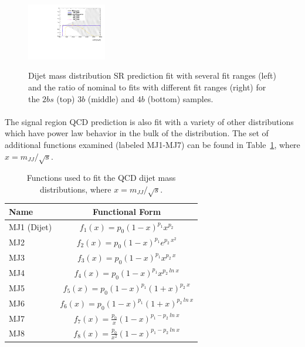 \begin{figure}[htbp!]
\begin{center}
\includegraphics[width=0.31\textwidth,angle=-90]{figures/boosted/Syst_Smooth/smoothFuncRangeCompare_44_comp_ratio.pdf} \\
\caption{Dijet mass distribution SR prediction fit with several fit ranges (left) and the ratio of nominal to fits with different fit ranges (right)  for the $2bs$ (top) $3b$ (middle) and $4b$ (bottom) samples. }
\label{fig:qcd_fit_range_sys_ratio-scaled}
\end{center}
\end{figure}

\paragraph{}
The signal region QCD prediction is also fit with a variety of other distributions which have power law behavior in the bulk of the distribution. 
The set of additional functions examined (labeled MJ1-MJ7) can be found in Table~\ref{tab:fit_funcs}, where $x = m_{JJ} / \sqrt{s}$.

\begin{table}[htbp!]
\begin{center} 
\begin{tabular}{  l | c}
Name & Functional Form \\
\hline
MJ1 (Dijet) & $f_{1}(x) = p_0 (1-x)^{p_1} x^{p_2}$ \\
MJ2 & $f_{2}(x) = p_0 (1-x)^{p_1} e^{p_2\ x^2}$ \\
MJ3 & $f_{3}(x) = p_0 (1-x)^{p_1} x^{p_2\ x}$ \\
MJ4 & $f_{4}(x) = p_0 (1-x)^{p_1} x^{p_2\ ln\ x}$ \\
MJ5 & $f_{5}(x) = p_0 (1-x)^{p_1} (1+x)^{p_2\ x}$ \\
MJ6 & $f_{6}(x) = p_0 (1-x)^{p_1} (1+x)^{p_2\ ln\ x}$ \\
MJ7 & $f_{7}(x) = \frac{p_0}{x} (1-x)^{p_1 - p_2\ ln\ x}$ \\
MJ8 & $f_{8}(x) = \frac{p_0}{x^2} (1-x)^{p_1 - p_2\ ln\ x}$ \\
\hline
\end{tabular}
\caption{Functions used to fit the QCD dijet mass distributions, where $x = m_{JJ} / \sqrt{s}$.}
\label{tab:fit_funcs}
\end{center}
\end{table}

